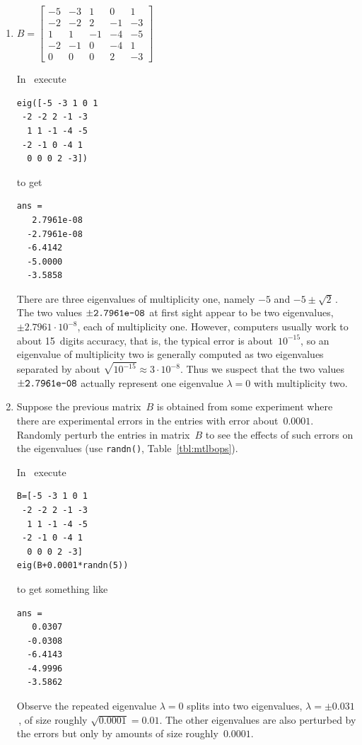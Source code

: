 \begin{example}
\begin{enumerate}
\item \(B=\begin{bmatrix}-5&-3&1&0&1
\\-2&-2&2&-1&-3
\\1&1&-1&-4&-5
\\-2&-1&0&-4&1
\\0&0&0&2&-3\end{bmatrix}\)
\begin{solution} 
In \script\ execute
\begin{verbatim}
eig([-5 -3 1 0 1
 -2 -2 2 -1 -3
  1 1 -1 -4 -5
 -2 -1 0 -4 1
  0 0 0 2 -3])
\end{verbatim}
\setbox\ajrqrbox\hbox{}%
\marginpar{\usebox{\ajrqrbox}}%
to get
\begin{verbatim}
ans =
   2.7961e-08
  -2.7961e-08
  -6.4142
  -5.0000
  -3.5858
\end{verbatim}
There are three eigenvalues of multiplicity one, namely \(-5\) and \(-5\pm\sqrt2\)\,.  
The two values \(\pm\verb|2.7961e-08|\) at first sight appear to be two eigenvalues, \(\pm2.7961\cdot10^{-8}\), each of multiplicity one.  
However, computers usually work to about 15~digits accuracy, that is, the typical error is about~\(10^{-15}\), so an eigenvalue of multiplicity two is generally computed as two eigenvalues separated by about \(\sqrt{10^{-15}}\approx3\cdot10^{-8}\).
Thus we suspect that the two values~\(\pm\verb|2.7961e-08|\) actually represent one eigenvalue \(\lambda=0\) with multiplicity two.
\end{solution}


\item Suppose the previous matrix~\(B\) is obtained from some experiment where there are experimental errors in the entries with error about~\(0.0001\).
Randomly perturb the entries in matrix~\(B\) to see the effects of such errors on the eigenvalues (use \verb|randn()|, Table~\ref{tbl:mtlbops}).
\begin{solution} 
In \script\ execute
\begin{verbatim}
B=[-5 -3 1 0 1
 -2 -2 2 -1 -3
  1 1 -1 -4 -5
 -2 -1 0 -4 1
  0 0 0 2 -3]
eig(B+0.0001*randn(5))
\end{verbatim}
\setbox\ajrqrbox\hbox{}%
\marginpar{\usebox{\ajrqrbox}}%
to get something like
\begin{verbatim}
ans =
   0.0307
  -0.0308
  -6.4143
  -4.9996
  -3.5862
\end{verbatim}
Observe the repeated eigenvalue \(\lambda=0\) splits into two eigenvalues, \(\lambda=\pm0.031\)\,, of size roughly \(\sqrt{0.0001}=0.01\).
The other eigenvalues are also perturbed by the errors but only by amounts of size roughly~\(0.0001\).


\end{solution}
\end{enumerate}
\end{example}
